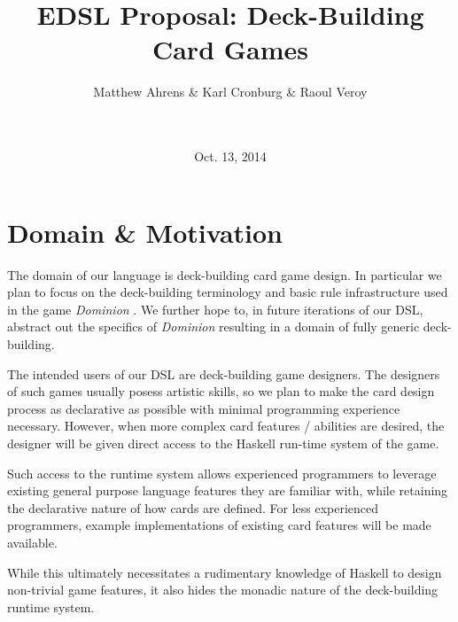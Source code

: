 \documentclass{acm_proc_article-sp}
\begin{document}
\title{EDSL Proposal: Deck-Building Card Games}

\author{
  \alignauthor
  Matthew Ahrens \& Karl Cronburg \& Raoul Veroy \\
   \\
         \\
}
\date{Oct. 13, 2014}

\maketitle


\section{Domain \& Motivation}
\label{sec:domain}
%

The domain of our language is deck-building card game design. In particular we
plan to focus on the deck-building terminology and basic rule infrastructure
used in the game \emph{Dominion} \cite{Vaccarino2008}. We further hope to,
in future iterations of our DSL, abstract out the specifics of \emph{Dominion}
resulting in a domain of fully generic deck-building.

The intended users of our DSL are deck-building game designers. The designers
of such games usually posess artistic skills, so we plan to make the card
design process as declarative as possible with minimal programming experience
necessary. However, when more complex card features / abilities are
desired, the designer will be given direct access to the Haskell run-time
system of the game.

Such access to the runtime system allows experienced
programmers to leverage existing general purpose language features they
are familiar with, while retaining the declarative nature of how cards are
defined. For less experienced programmers, example implementations of
existing card features will be made available.

While this ultimately necessitates a rudimentary knowledge of Haskell
to design non-trivial game features, it also hides the monadic nature of
the deck-building runtime system.
\end{document}
